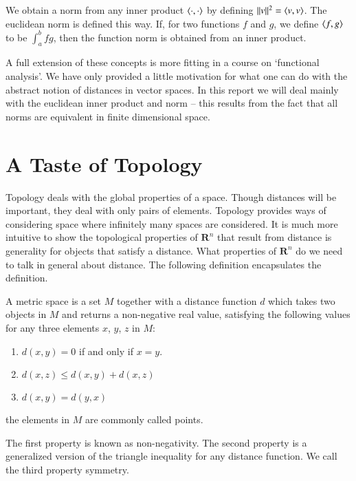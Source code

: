 We obtain a norm from any inner product $\langle\cdot, \cdot\rangle$ by defining $\|v\|^2 = \langle v, v\rangle$. The euclidean norm is defined this way. If, for two functions $f$ and $g$, we define $\langle f,g\rangle$ to be $\int_a^b fg$, then the function norm is obtained from an inner product.

A full extension of these concepts is more fitting in a course on `functional analysis'. We have only provided a little motivation for what one can do with the abstract notion of distances in vector spaces. In this report we will deal mainly with the euclidean inner product and norm -- this results from the fact that all norms are equivalent in finite dimensional space.





\chapter{A Taste of Topology}

Topology deals with the global properties of a space. Though distances will be important, they deal with only pairs of elements. Topology provides ways of considering space where infinitely many spaces are considered. It is much more intuitive to show the topological properties of $\mathbf{R}^n$ that result from distance is generality for objects that satisfy a distance. What properties of $\mathbf{R}^n$ do we need to talk in general about distance. The following definition encapsulates the definition.

\begin{definition}
  A metric space is a set $M$ together with a distance function $d$ which takes two objects in $M$ and returns a non-negative real value, satisfying the following values for any three elements $x$, $y$, $z$ in $M$:
  \begin{enumerate}
    \item $d(x,y) = 0$ if and only if $x = y$.
    \item $d(x,z) \leq d(x,y) + d(x,z)$
    \item $d(x,y) = d(y,x)$
  \end{enumerate}
  the elements in $M$ are commonly called points.
\end{definition}

The first property is known as non-negativity. The second property is a generalized version of the triangle inequality for any distance function. We call the third property symmetry.

